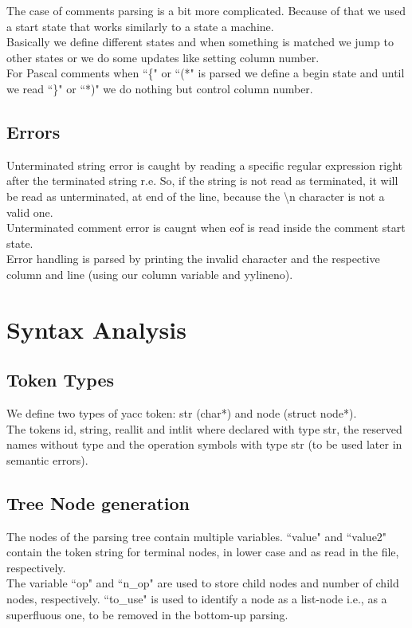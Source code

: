 \documentclass[12pt]{article}
\begin{document}
The case of comments parsing is a bit more complicated. Because of that we used a start state that works similarly to a state a machine.\\
Basically we define different states and when something is matched we jump to other states or we do some updates like setting column number.\\
For Pascal comments when ``\{" or ``(*" is parsed we define a begin state and until we read ``\}" or ``*)" we do nothing but control column number.\\

\subsection{Errors}

Unterminated string error is caught by reading a specific regular expression right after the terminated string r.e. So, if the string is not read as terminated, it will be read as unterminated, at end of the line, because the \textbackslash n character is not a valid one.\\
Unterminated comment error is caugnt when eof is read inside the comment start state.\\
Error handling is parsed by printing the invalid character and the respective column and line (using our column variable and yylineno).\\

\newpage

\section{Syntax Analysis}

\subsection{Token Types}

We define two types of yacc token: str (char*) and node (struct node*). \\
The tokens id, string, reallit and intlit where declared with type str, the reserved names without type and the operation symbols with type str (to be used later in semantic errors).\\

\subsection{Tree Node generation}

The nodes of the parsing tree contain multiple variables. ``value" and ``value2" contain the token string for terminal nodes, in lower case and as read in the file, respectively.\\
The variable ``op" and ``n\_op" are used to store child nodes and number of child nodes, respectively. ``to\_use" is used to identify a node as a list-node i.e., as a superfluous one, to be removed in the bottom-up parsing.
\end{document}
